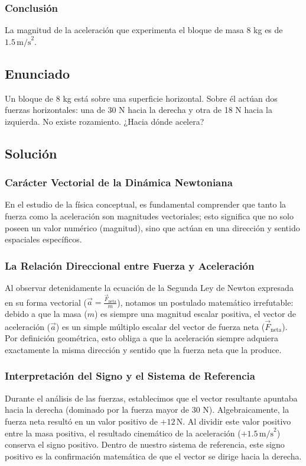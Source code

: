 \documentclass[12pt]{article}
\begin{document}
\subsubsection*{Conclusión}
La magnitud de la aceleración que experimenta el bloque de masa 8 kg es de $1.5 \, \text{m/s}^2$.

\newpage

\subsection*{Enunciado}
Un bloque de 8 kg está sobre una superficie horizontal. Sobre él actúan dos fuerzas horizontales: una de 30 N hacia la derecha y otra de 18 N hacia la izquierda. No existe rozamiento. ¿Hacia dónde acelera?

\subsection*{Solución}

\subsubsection*{Carácter Vectorial de la Dinámica Newtoniana}
En el estudio de la física conceptual, es fundamental comprender que tanto la fuerza como la aceleración son magnitudes vectoriales; esto significa que no solo poseen un valor numérico (magnitud), sino que actúan en una dirección y sentido espaciales específicos.

\subsubsection*{La Relación Direccional entre Fuerza y Aceleración}
Al observar detenidamente la ecuación de la Segunda Ley de Newton expresada en su forma vectorial ($\vec{a} = \frac{\vec{F}_{\text{neta}}}{m}$), notamos un postulado matemático irrefutable: debido a que la masa ($m$) es siempre una magnitud escalar positiva, el vector de aceleración ($\vec{a}$) es un simple múltiplo escalar del vector de fuerza neta ($\vec{F}_{\text{neta}}$). Por definición geométrica, esto obliga a que la aceleración siempre adquiera exactamente la misma dirección y sentido que la fuerza neta que la produce.

\subsubsection*{Interpretación del Signo y el Sistema de Referencia}
Durante el análisis de las fuerzas, establecimos que el vector resultante apuntaba hacia la derecha (dominado por la fuerza mayor de 30 N). Algebraicamente, la fuerza neta resultó en un valor positivo de $+12 \, \text{N}$. Al dividir este valor positivo entre la masa positiva, el resultado cinemático de la aceleración ($+1.5 \, \text{m/s}^2$) conserva el signo positivo. Dentro de nuestro sistema de referencia, este signo positivo es la confirmación matemática de que el vector se dirige hacia la derecha.
\end{document}
